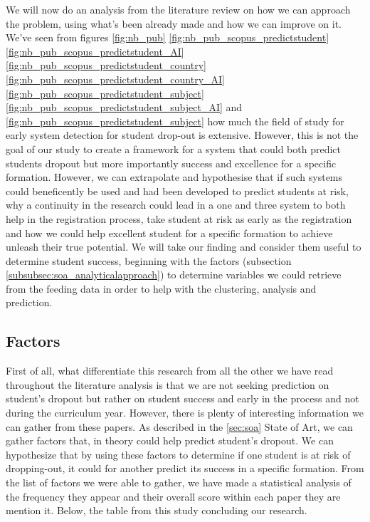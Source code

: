 \documentclass[../main.tex]{subfiles}
\begin{document}
We will now do an analysis from the literature review on how we can approach the problem, using what's been already made and how we can improve on it.
We've seen from figures \ref{fig:nb_pub}
\ref{fig:nb_pub_scopus_predictstudent}
\ref{fig:nb_pub_scopus_predictstudent_AI}
\ref{fig:nb_pub_scopus_predictstudent_country}
\ref{fig:nb_pub_scopus_predictstudent_country_AI}
\ref{fig:nb_pub_scopus_predictstudent_subject}
\ref{fig:nb_pub_scopus_predictstudent_subject_AI}
and \ref{fig:nb_pub_scopus_predictstudent_subject} how much the field of study for early system detection for student drop-out is extensive. However, this is not the goal of our study to create a framework for a system that could both predict students dropout but more importantly success and excellence for a specific formation. 
However, we can extrapolate and hypothesise that if such systems could beneficently be used and had been developed to predict students at risk, why a continuity in the research could lead in a one and three system to both help in the registration process, take student at risk as early as the registration and how we could help excellent student for a specific formation to achieve unleash their true potential.
We will take our finding and consider them useful to determine student success, beginning with the factors (subsection \ref{subsubsec:soa_analyticalapproach}) to determine variables we could retrieve from the feeding data in order to help with the clustering, analysis and prediction.

\subsection{Factors}
\label{subsec:analysis_factors}
First of all, what differentiate this research from all the other we have read throughout the literature analysis is that we are not seeking prediction on student's dropout but rather on student success and early in the process and not during the curriculum year. However, there is plenty of interesting information we can gather from these papers. As described in the \ref{sec:soa} State of Art, we can gather factors that, in theory could help predict student's dropout. We can hypothesize that by using these factors to determine if one student is at risk of dropping-out, it could for another predict its success in a specific formation. From the list of factors we were able to gather, we have made a statistical analysis of the frequency they appear and their overall score within each paper they are mention it. Below, the table from this study concluding our research.
\end{document}
